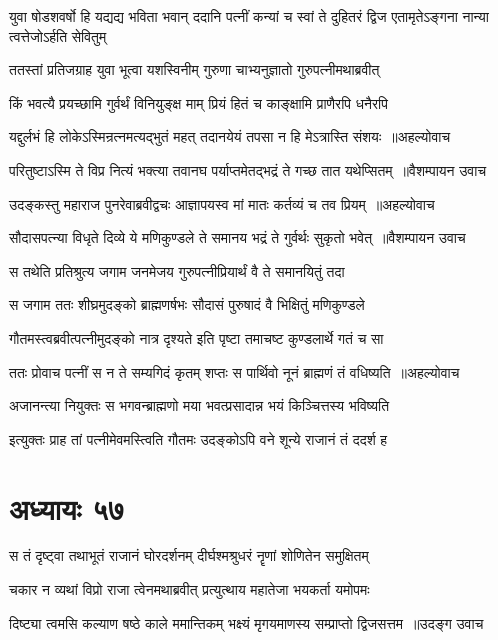 \threelineshloka
{युवा षोडशवर्षो हि यद्यद्य भविता भवान्}
{ददानि पत्नीं कन्यां च स्वां ते दुहितरं द्विज}
{एतामृतेऽङ्गना नान्या त्वत्तेजोऽर्हति सेवितुम्}


\twolineshloka
{ततस्तां प्रतिजग्राह युवा भूत्वा यशस्विनीम्}
{गुरुणा चाभ्यनुज्ञातो गुरुपत्नीमथाब्रवीत्}


\twolineshloka
{किं भवत्यै प्रयच्छामि गुर्वर्थं विनियुङ्क्ष माम्}
{प्रियं हितं च काङ्क्षामि प्राणैरपि धनैरपि}


\threelineshloka
{यद्दुर्लभं हि लोकेऽस्मिन्रत्नमत्यद्भुतं महत्}
{तदानयेयं तपसा न हि मेऽत्रास्ति संशयः ॥अहल्योवाच}
{}


\threelineshloka
{परितुष्टाऽस्मि ते विप्र नित्यं भक्त्या तवानघ}
{पर्याप्तमेतद्भद्रं ते गच्छ तात यथेप्सितम् ॥वैशम्पायन उवाच}
{}


\threelineshloka
{उदङ्कस्तु महाराज पुनरेवाब्रवीद्वचः}
{आज्ञापयस्व मां मातः कर्तव्यं च तव प्रियम् ॥अहल्योवाच}
{}


\threelineshloka
{सौदासपत्न्या विधृते दिव्ये ये मणिकुण्डले}
{ते समानय भद्रं ते गुर्वर्थः सुकृतो भवेत् ॥वैशम्पायन उवाच}
{}


\twolineshloka
{स तथेति प्रतिश्रुत्य जगाम जनमेजय}
{गुरुपत्नीप्रियार्थं वै ते समानयितुं तदा}


\twolineshloka
{स जगाम ततः शीघ्रमुदङ्को ब्राह्मणर्षभः}
{सौदासं पुरुषादं वै भिक्षितुं मणिकुण्डले}


\twolineshloka
{गौतमस्त्वब्रवीत्पत्नीमुदङ्को नात्र दृश्यते}
{इति पृष्टा तमाचष्ट कुण्डलार्थे गतं च सा}


\threelineshloka
{ततः प्रोवाच पत्नीं स न ते सम्यगिदं कृतम्}
{शप्तः स पार्थिवो नूनं ब्राह्मणं तं वधिष्यति ॥अहल्योवाच}
{}


\twolineshloka
{अजानन्त्या नियुक्तः स भगवन्ब्राह्मणो मया}
{भवत्प्रसादान्न भयं किञ्चित्तस्य भविष्यति}


\twolineshloka
{इत्युक्तः प्राह तां पत्नीमेवमस्त्विति गौतमः}
{उदङ्कोऽपि वने शून्ये राजानं तं ददर्श ह}


\chapter{अध्यायः ५७}
\twolineshloka
{स तं दृष्ट्वा तथाभूतं राजानं घोरदर्शनम्}
{दीर्घश्मश्रुधरं नॄणां शोणितेन समुक्षितम्}


\twolineshloka
{चकार न व्यथां विप्रो राजा त्वेनमथाब्रवीत्}
{प्रत्युत्थाय महातेजा भयकर्ता यमोपमः}


\threelineshloka
{दिष्ट्या त्वमसि कल्याण षष्ठे काले ममान्तिकम्}
{भक्ष्यं मृगयमाणस्य सम्प्राप्तो द्विजसत्तम ॥उदङ्ग उवाच}
{}


